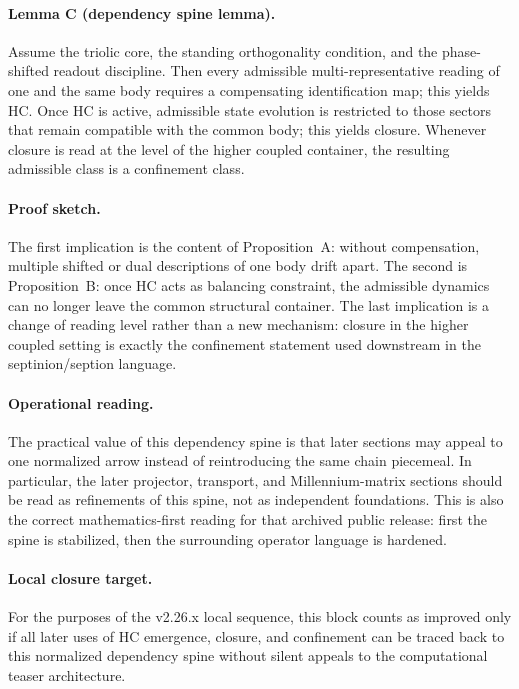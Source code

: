 \paragraph{Lemma C (dependency spine lemma).}
Assume the triolic core, the standing orthogonality condition, and the
phase-shifted readout discipline. Then every admissible multi-representative
reading of one and the same body requires a compensating identification map;
this yields HC. Once HC is active, admissible state evolution is restricted to
those sectors that remain compatible with the common body; this yields closure.
Whenever closure is read at the level of the higher coupled container, the
resulting admissible class is a confinement class.

\paragraph{Proof sketch.}
The first implication is the content of Proposition~A: without compensation,
multiple shifted or dual descriptions of one body drift apart. The second is
Proposition~B: once HC acts as balancing constraint, the admissible dynamics can
no longer leave the common structural container. The last implication is a
change of reading level rather than a new mechanism: closure in the higher
coupled setting is exactly the confinement statement used downstream in the
septinion/seption language.

\paragraph{Operational reading.}
The practical value of this dependency spine is that later sections may appeal
to one normalized arrow instead of reintroducing the same chain piecemeal. In
particular, the later projector, transport, and Millennium-matrix sections
should be read as refinements of this spine, not as independent foundations.
This is also the correct mathematics-first reading for that archived public release:
first the spine is stabilized, then the surrounding operator language is
hardened.

\paragraph{Local closure target.}
For the purposes of the v2.26.x local sequence, this block counts as improved
only if all later uses of HC emergence, closure, and confinement can be traced
back to this normalized dependency spine without silent appeals to the
computational teaser architecture.

